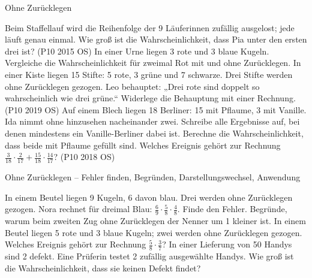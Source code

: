 \begin{aufgabe}{Ohne Zurücklegen}
\begin{teile}
\teil Beim Staffellauf wird die Reihenfolge der 9 Läuferinnen zufällig ausgelost; jede läuft genau einmal. Wie groß ist die Wahrscheinlichkeit, dass Pia unter den ersten drei ist? \hfill (P10 2015 OS)
\teil In einer Urne liegen 3 rote und 3 blaue Kugeln. Vergleiche die Wahrscheinlichkeit für zweimal Rot mit und ohne Zurücklegen.
\teil In einer Kiste liegen 15 Stifte: 5 rote, 3 grüne und 7 schwarze. Drei Stifte werden ohne Zurücklegen gezogen. Leo behauptet: „Drei rote sind doppelt so wahrscheinlich wie drei grüne.“ Widerlege die Behauptung mit einer Rechnung. \hfill (P10 2019 OS)
\teil Auf einem Blech liegen 18 Berliner: 15 mit Pflaume, 3 mit Vanille. Ida nimmt ohne hinzusehen nacheinander zwei. Schreibe alle Ergebnisse auf, bei denen mindestens ein Vanille-Berliner dabei ist. Berechne die Wahrscheinlichkeit, dass beide mit Pflaume gefüllt sind. Welches Ereignis gehört zur Rechnung $\frac{3}{18} \cdot \frac{2}{17} + \frac{15}{18} \cdot \frac{14}{17}$? \hfill (P10 2018 OS)
\end{teile}
\end{aufgabe}

\begin{aufgabe}{Ohne Zurücklegen – Fehler finden, Begründen, Darstellungswechsel, Anwendung}
\begin{teile}
\teil In einem Beutel liegen 9 Kugeln, 6 davon blau. Drei werden ohne Zurücklegen gezogen. Nora rechnet für dreimal Blau: $\frac{6}{9} \cdot \frac{5}{8} \cdot \frac{4}{8}$. Finde den Fehler.
\teil Begründe, warum beim zweiten Zug ohne Zurücklegen der Nenner um 1 kleiner ist.
\teil In einem Beutel liegen 5 rote und 3 blaue Kugeln; zwei werden ohne Zurücklegen gezogen. Welches Ereignis gehört zur Rechnung $\frac{5}{8} \cdot \frac{3}{7}$?
\teil In einer Lieferung von 50 Handys sind 2 defekt. Eine Prüferin testet 2 zufällig ausgewählte Handys. Wie groß ist die Wahrscheinlichkeit, dass sie keinen Defekt findet?
\end{teile}
\end{aufgabe}
